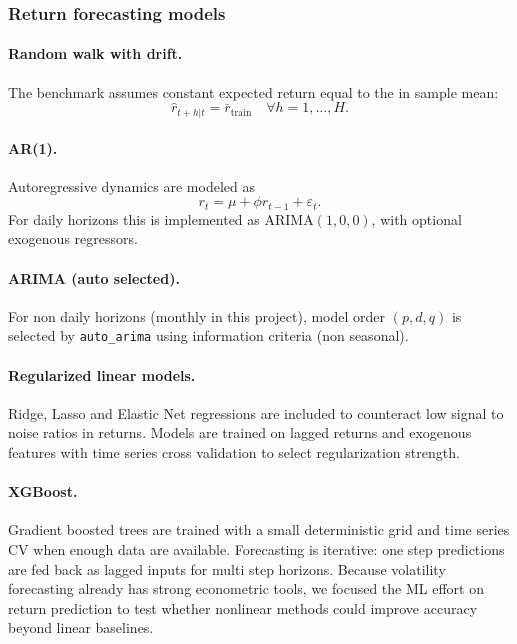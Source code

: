\documentclass[11pt,a4paper]{article}
\begin{document}
\subsubsection{Return forecasting models}
\paragraph{Random walk with drift.} The benchmark assumes constant expected return equal to the in sample mean:
\begin{equation}
\hat r_{t+h|t} = \bar r_{\text{train}} \quad \forall h=1,\dots,H.
\end{equation}

\paragraph{AR(1).} Autoregressive dynamics are modeled as
\begin{equation}
 r_t = \mu + \phi r_{t-1} + \varepsilon_t.
\end{equation}
For daily horizons this is implemented as ARIMA$(1,0,0)$, with optional exogenous regressors.

\paragraph{ARIMA (auto selected).} For non daily horizons (monthly in this project), model order $(p,d,q)$ is selected by \texttt{auto\_arima} using information criteria (non seasonal).

\paragraph{Regularized linear models.} Ridge, Lasso and Elastic Net regressions are included to counteract low signal to noise ratios in returns. Models are trained on lagged returns and exogenous features with time series cross validation to select regularization strength.

\paragraph{XGBoost.} Gradient boosted trees are trained with a small deterministic grid and time series CV when enough data are available. Forecasting is iterative: one step predictions are fed back as lagged inputs for multi step horizons.
\noindent Because volatility forecasting already has strong econometric tools, we focused the ML effort on return prediction to test whether nonlinear methods could improve accuracy beyond linear baselines.
\end{document}
